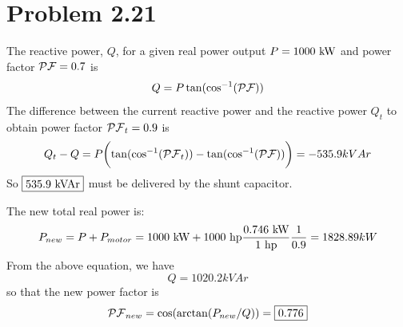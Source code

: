 \documentclass{homework}
\begin{document}
\section{Problem 2.21}
\begin{letterenum}
    \item The reactive power, $Q$, for a given real power output $P = 1000 \text{ kW}$
        and power factor $\mathcal{PF} = 0.7$ is 
        \begin{equation*}
            Q = P \tan(\text{cos}^{-1}(\mathcal{PF}))
        \end{equation*}
        The difference between the current reactive power
        and the reactive power $Q_t$ to obtain power factor
        $\mathcal{PF}_t = 0.9$ is
        \begin{equation*}
            Q_t - Q = P \biggl(
                \tan(\text{cos}^{-1}(\mathcal{PF}_t)) - \tan(\text{cos}^{-1}(\mathcal{PF}))\biggr)
                = -535.9 kVAr
        \end{equation*}
        So $\boxed{$535.9 kVAr$}$ must be delivered by the shunt capacitor.

    \item The new total real power is: 
    \begin{equation*}
        P_{new} = P + P_{motor} = 1000 \text{ kW} + 1000 \text{ hp}
            \frac{0.746 \text{ kW}}{1 \text{ hp}} \frac{1}{0.9} = 1828.89 kW
    \end{equation*}
    From the above equation, we have
    \begin{equation*}
        Q = 1020.2 kVAr
    \end{equation*}
    so that the new power factor is
    \begin{equation*}
        \mathcal{PF}_{new} = \cos(\arctan(P_{new}/Q)) = \boxed{0.776}
    \end{equation*}
\end{letterenum}
\end{document}
